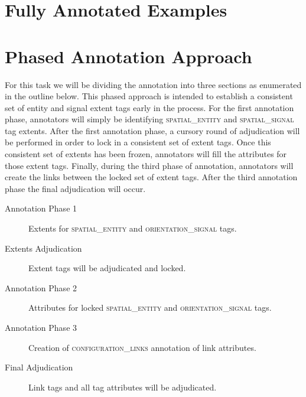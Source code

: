 \documentclass[11pt]{article}
\begin{document}
\section{Fully Annotated Examples} %
\label{sec:fully_annotated_examples}





\section{Phased Annotation Approach} %
\label{sec:phased_annotation_approach}

For this task we will be dividing the annotation into three sections as enumerated in the outline below. This phased approach is intended to establish a consistent set of entity and signal extent tags early in the process. For the first annotation phase, annotators will simply be identifying \textsc{spatial\_entity} and \textsc{spatial\_signal} tag extents. After the first annotation phase, a cursory round of adjudication will be performed in order to lock in a consistent set of extent tags. Once this consistent set of extents has been frozen, annotators will fill the attributes for those extent tags. Finally, during the third phase of annotation, annotators will create the links between the locked set of extent tags. After the third annotation phase the final adjudication will occur.

\begin{description}
    \item[Annotation Phase 1] Extents for \textsc{spatial\_entity} and \textsc{orientation\_signal} tags.
    \item[Extents Adjudication] Extent tags will be adjudicated and locked.
    \item[Annotation Phase 2] Attributes for locked \textsc{spatial\_entity} and \textsc{orientation\_signal} tags.
    \item[Annotation Phase 3] Creation of \textsc{configuration\_links} annotation of link attributes.
    \item[Final Adjudication] Link tags and all tag attributes will be adjudicated.
\end{description}
\label{desc:phases}


\end{document}
